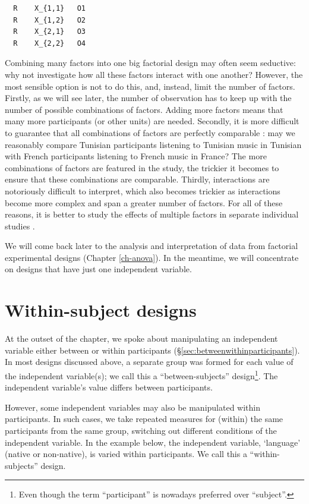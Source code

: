 \documentclass[
]{book}
\begin{document}
\begin{verbatim}
  R    X_{1,1}   O1
  R    X_{1,2}   O2
  R    X_{2,1}   O3
  R    X_{2,2}   O4
\end{verbatim}

Combining many factors into one big factorial design may often seem seductive: why not investigate how all these factors interact with one another? However, the most sensible option is not to do this, and, instead, limit the number of factors. Firstly, as we will see later, the number of observation has to keep up with the number of possible combinations of factors. Adding more factors means that many more participants (or other units) are needed. Secondly, it is more difficult to guarantee that all combinations of factors are perfectly comparable \citep[p.266]{SCC02}: may we reasonably compare Tunisian participants listening to Tunisian music in Tunisian with French participants listening to French music in France? The more combinations of factors are featured in the study, the trickier it becomes to ensure that these combinations are comparable. Thirdly, interactions are notoriously difficult to interpret, which also becomes trickier as interactions become more complex and span a greater number of factors. For all of these reasons, it is better to study the effects of multiple factors in separate individual studies \citep{Quene10}.

We will come back later to the analysis and interpretation of data from factorial experimental designs (Chapter \ref{ch-anova}).
In the meantime, we will concentrate on designs that have just one independent variable.

\section{Within-subject designs}\label{sec:within-subject-designs}

At the outset of the chapter, we spoke about manipulating an independent variable either between or within participants (§\ref{sec:betweenwithinparticipants}). In most designs discussed above, a separate group was formed for each value of the independent variable(s); we call this a ``between-subjects'' design\footnote{Even though the term ``participant'' is nowadays preferred over ``subject''.}. The independent variable's value differs between participants.

However, some independent variables may also be manipulated within participants. In such cases, we take repeated measures for (within) the same participants from the same group, switching out different conditions of the independent variable. In the example below, the independent variable, `language' (native or non-native), is varied within participants. We call this a ``within-subjects'' design.
\end{document}
